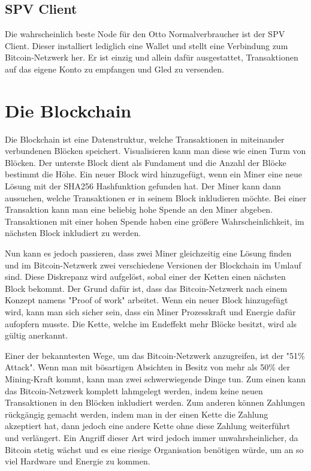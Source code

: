 \subsection{SPV Client}
Die wahrscheinlich beste Node für den Otto Normalverbraucher ist der SPV Client. Dieser installiert lediglich eine Wallet und
stellt eine Verbindung zum Bitcoin-Netzwerk her. Er ist einzig und allein dafür ausgestattet, Transaktionen auf das eigene Konto
zu empfangen und Gled zu versenden. 



\section{Die Blockchain}
Die Blockchain ist eine Datenstruktur, welche Transaktionen in miteinander verbundenen Blöcken speichert. Visualisieren kann man
diese wie einen Turm von Blöcken. Der unterste Block dient als Fundament und die Anzahl der Blöcke bestimmt die Höhe. Ein neuer
Block wird hinzugefügt, wenn ein Miner eine neue Lösung mit der SHA256 Hashfunktion gefunden hat. Der Miner kann dann aussuchen,
welche Transaktionen er in seinem Block inkludieren möchte. Bei einer Transaktion kann man eine beliebig hohe Spende an den Miner
abgeben. Transaktionen mit einer hohen Spende haben eine größere Wahrscheinlichkeit, im nächsten Block inkludiert zu werden.

Nun kann es jedoch passieren, dass zwei Miner gleichzeitig eine Lösung finden und im Bitcoin-Netzwerk zwei verschiedene Versionen
der Blockchain im Umlauf sind. Diese Diskrepanz wird aufgelöst, sobal einer der Ketten einen nächsten Block bekommt. Der Grund
dafür ist, dass das Bitcoin-Netzwerk nach einem Konzept namens "Proof of work" arbeitet. Wenn ein neuer Block hinzugefügt wird,
kann man sich sicher sein, dass ein Miner Prozesskraft und Energie dafür aufopfern musste. Die Kette, welche im Endeffekt mehr
Blöcke besitzt, wird als gültig anerkannt.

Einer der bekanntesten Wege, um das Bitcoin-Netzwerk anzugreifen, ist der "51\% Attack". Wenn man mit bösartigen Absichten
in Besitz von mehr als 50\% der Mining-Kraft kommt, kann man zwei schwerwiegende Dinge tun. Zum einen kann das Bitcoin-Netzwerk
komplett lahmgelegt werden, indem keine neuen Transaktionen in den Blöcken inkludiert werden. Zum anderen können Zahlungen
rückgängig gemacht werden, indem man in der einen Kette die Zahlung akzeptiert hat, dann jedoch eine andere Kette ohne diese 
Zahlung weiterführt und verlängert. Ein Angriff dieser Art wird jedoch immer unwahrsheinlicher, da Bitcoin stetig wächst und
es eine riesige Organisation benötigen würde, um an so viel Hardware und Energie zu kommen.

